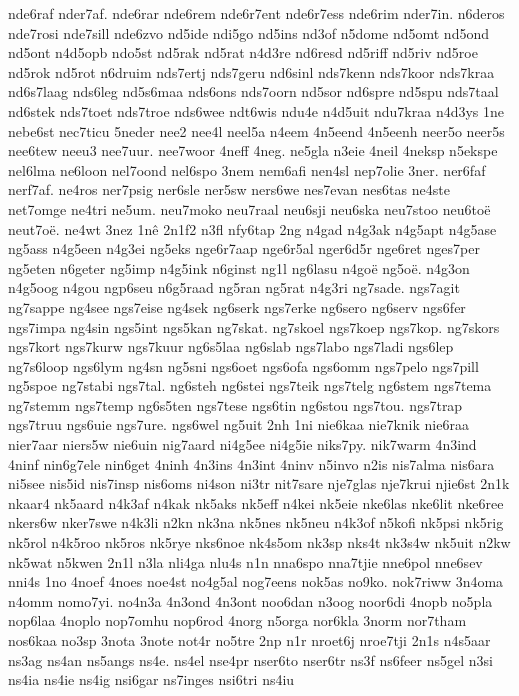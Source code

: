 nde6raf
nder7af.
nde6rar
nde6rem
nde6r7ent
nde6r7ess
nde6rim
nder7in.
n6deros
nde7rosi
nde7sill
nde6zvo
nd5ide
ndi5go
nd5ins
nd3of
n5dome
nd5omt
nd5ond
nd5ont
n4d5opb
ndo5st
nd5rak
nd5rat
n4d3re
nd6resd
nd5riff
nd5riv
nd5roe
nd5rok
nd5rot
n6druim
nds7ertj
nds7geru
nd6sinl
nds7kenn
nds7koor
nds7kraa
nd6s7laag
nds6leg
nd5s6maa
nds6ons
nds7oorn
nd5sor
nd6spre
nd5spu
nds7taal
nd6stek
nds7toet
nds7troe
nds6wee
ndt6wis
ndu4e
n4d5uit
ndu7kraa
n4d3ys
1ne
nebe6st
nec7ticu
5neder
nee2
nee4l
neel5a
n4eem
4n5eend
4n5eenh
neer5o
neer5s
nee6tew
neeu3
nee7uur.
nee7woor
4neff
4neg.
ne5gla
n3eie
4neil
4neksp
n5ekspe
nel6lma
ne6loon
nel7oond
nel6spo
3nem
nem6afi
nen4sl
nep7olie
3ner.
ner6faf
nerf7af.
ne4ros
ner7psig
ner6sle
ner5sw
ners6we
nes7evan
nes6tas
ne4ste
net7omge
ne4tri
ne5um.
neu7moko
neu7raal
neu6sji
neu6ska
neu7stoo
neu6toë
neut7oë.
ne4wt
3nez
1nê
2n1f2
n3fl
nfy6tap
2ng
n4gad
n4g3ak
n4g5apt
n4g5ase
ng5ass
n4g5een
n4g3ei
ng5eks
nge6r7aap
nge6r5al
nger6d5r
nge6ret
nges7per
ng5eten
n6geter
ng5imp
n4g5ink
n6ginst
ng1l
ng6lasu
n4goë
ng5oë.
n4g3on
n4g5oog
n4gou
ngp6seu
n6g5raad
ng5ran
ng5rat
n4g3ri
ng7sade.
ngs7agit
ng7sappe
ng4see
ngs7eise
ng4sek
ng6serk
ngs7erke
ng6sero
ng6serv
ngs6fer
ngs7impa
ng4sin
ngs5int
ngs5kan
ng7skat.
ng7skoel
ngs7koep
ngs7kop.
ng7skors
ngs7kort
ngs7kurw
ngs7kuur
ng6s5laa
ng6slab
ngs7labo
ngs7ladi
ngs6lep
ng7s6loop
ngs6lym
ng4sn
ng5sni
ngs6oet
ngs6ofa
ngs6omm
ngs7pelo
ngs7pill
ng5spoe
ng7stabi
ngs7tal.
ng6steh
ng6stei
ngs7teik
ngs7telg
ng6stem
ngs7tema
ng7stemm
ngs7temp
ng6s5ten
ngs7tese
ngs6tin
ng6stou
ngs7tou.
ngs7trap
ngs7truu
ngs6uie
ngs7ure.
ngs6wel
ng5uit
2nh
1ni
nie6kaa
nie7knik
nie6raa
nier7aar
niers5w
nie6uin
nig7aard
ni4g5ee
ni4g5ie
niks7py.
nik7warm
4n3ind
4ninf
nin6g7ele
nin6get
4ninh
4n3ins
4n3int
4ninv
n5invo
n2is
nis7alma
nis6ara
ni5see
nis5id
nis7insp
nis6oms
ni4son
ni3tr
nit7sare
nje7glas
nje7krui
njie6st
2n1k
nkaar4
nk5aard
n4k3af
n4kak
nk5aks
nk5eff
n4kei
nk5eie
nke6las
nke6lit
nke6ree
nkers6w
nker7swe
n4k3li
n2kn
nk3na
nk5nes
nk5neu
n4k3of
n5kofi
nk5psi
nk5rig
nk5rol
n4k5roo
nk5ros
nk5rye
nks6noe
nk4s5om
nk3sp
nks4t
nk3s4w
nk5uit
n2kw
nk5wat
n5kwen
2n1l
n3la
nli4ga
nlu4s
n1n
nna6spo
nna7tjie
nne6pol
nne6sev
nni4s
1no
4noef
4noes
noe4st
no4g5al
nog7eens
nok5as
no9ko.
nok7riww
3n4oma
n4omm
nomo7yi.
no4n3a
4n3ond
4n3ont
noo6dan
n3oog
noor6di
4nopb
no5pla
nop6laa
4noplo
nop7omhu
nop6rod
4norg
n5orga
nor6kla
3norm
nor7tham
nos6kaa
no3sp
3nota
3note
not4r
no5tre
2np
n1r
nroet6j
nroe7tji
2n1s
n4s5aar
ns3ag
ns4an
ns5angs
ns4e.
ns4el
nse4pr
nser6to
nser6tr
ns3f
ns6feer
ns5gel
n3si
ns4ia
ns4ie
ns4ig
nsi6gar
ns7inges
nsi6tri
ns4iu

